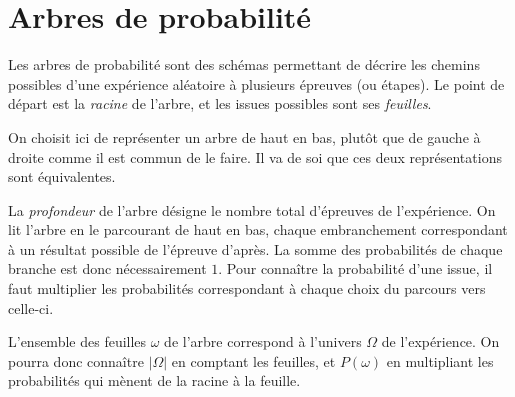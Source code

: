 

\section{Arbres de probabilité}

Les arbres de probabilité sont des schémas permettant de décrire les chemins possibles d'une expérience aléatoire à plusieurs épreuves (ou étapes).
Le point de départ est la \emph{racine} de l'arbre, et les issues possibles sont ses \emph{feuilles}.

On choisit ici de représenter un arbre de haut en bas, plutôt que de gauche à droite comme il est commun de le faire.
Il va de soi que ces deux représentations sont équivalentes.

La \emph{profondeur} de l'arbre désigne le nombre total d'épreuves de l'expérience.
On lit l'arbre en le parcourant de haut en bas, chaque embranchement correspondant à un résultat possible de l'épreuve d'après.
La somme des probabilités de chaque branche est donc nécessairement $1$.
Pour connaître la probabilité d'une issue, il faut multiplier les probabilités correspondant à chaque choix du parcours vers celle-ci.

L'ensemble des feuilles $\omega$ de l'arbre correspond à l'univers $\Omega$ de l'expérience.
On pourra donc connaître $|\Omega|$ en comptant les feuilles, et $P(\omega)$ en multipliant les probabilités qui mènent de la racine à la feuille.

